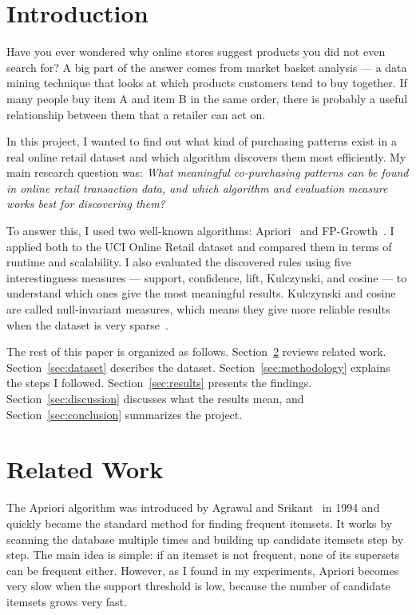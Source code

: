 \documentclass[conference]{IEEEtran}
\begin{document}
\section{Introduction}
\label{sec:introduction}

Have you ever wondered why online stores suggest products you did not even search for? A big part of the answer comes from market basket analysis — a data mining technique that looks at which products customers tend to buy together. If many people buy item A and item B in the same order, there is probably a useful relationship between them that a retailer can act on.

In this project, I wanted to find out what kind of purchasing patterns exist in a real online retail dataset and which algorithm discovers them most efficiently. My main research question was: \textit{What meaningful co-purchasing patterns can be found in online retail transaction data, and which algorithm and evaluation measure works best for discovering them?}

To answer this, I used two well-known algorithms: Apriori~\cite{b1} and FP-Growth~\cite{b2}. I applied both to the UCI Online Retail dataset and compared them in terms of runtime and scalability. I also evaluated the discovered rules using five interestingness measures — support, confidence, lift, Kulczynski, and cosine — to understand which ones give the most meaningful results. Kulczynski and cosine are called null-invariant measures, which means they give more reliable results when the dataset is very sparse~\cite{b3}.

The rest of this paper is organized as follows. Section~\ref{sec:related_work} reviews related work. Section~\ref{sec:dataset} describes the dataset. Section~\ref{sec:methodology} explains the steps I followed. Section~\ref{sec:results} presents the findings. Section~\ref{sec:discussion} discusses what the results mean, and Section~\ref{sec:conclusion} summarizes the project.

\section{Related Work}
\label{sec:related_work}

The Apriori algorithm was introduced by Agrawal and Srikant~\cite{b1} in 1994 and quickly became the standard method for finding frequent itemsets. It works by scanning the database multiple times and building up candidate itemsets step by step. The main idea is simple: if an itemset is not frequent, none of its supersets can be frequent either. However, as I found in my experiments, Apriori becomes very slow when the support threshold is low, because the number of candidate itemsets grows very fast.
\end{document}
